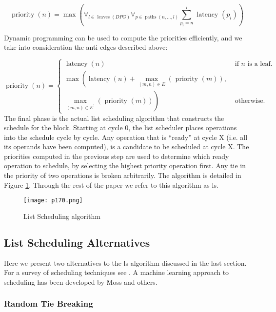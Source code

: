 $$
	\operatorname{priority}(n)=\max \left(\forall_{l \in \text { leaves }(D P G)} \forall_{p \in \operatorname{paths}(n, \ldots, l)} \sum_{p_i=n}^l \text { latency }\left(p_i\right)\right)
$$

Dynamic programming can be used to compute the priorities efficiently, and we take into consideration
the anti-edges described above:

$$
	\operatorname{priority}(n)=\left\{\begin{array}{cc}
		\operatorname{latency}(n)                                                                & \text { if } n \text { is a leaf. } \\
		\max \left(\operatorname{latency}(n)+\max _{(m, n) \in E}(\text { priority }(m)),\right. &                                     \\
		\left.\max _{(m, n) \in E^{\prime}}(\text { priority }(m))\right)                        & \text { otherwise. }
	\end{array}\right.
$$
The final phase is the actual list scheduling algorithm that constructs the schedule for the block. Starting
at cycle 0, the list scheduler places operations into the schedule cycle by cycle. Any operation that is “ready”
at cycle X (i.e. all its operands have been computed), is a candidate to be scheduled at cycle X. The priorities
computed in the previous step are used to determine which ready operation to schedule, by selecting the
highest priority operation first. Any tie in the priority of two operations is broken arbitrarily. The algorithm
is detailed in Figure \ref{fig:p170}. Through the rest of the paper we refer to this algorithm as ls.


\begin{figure}[H]
	\centering
	\texttt{[image: p170.png]}
	\caption{List Scheduling algorithm}
	\label{fig:p170}
\end{figure}


\subsection{List Scheduling Alternatives}

Here we present two alternatives to the ls algorithm discussed in the last section. For a survey of scheduling
techniques see . A machine learning approach to scheduling has been developed by Moss and others.



\subsubsection{Random Tie Breaking}

